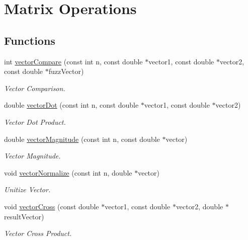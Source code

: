\hypertarget{group__a}{
\section{Matrix Operations}
\label{group__a}
}
\subsection*{Functions}
\begin{CompactItemize}
\item 
int \hyperlink{group__a_gfc9e8bb8b888bf8f1577f0f04ec74f09}{vectorCompare} (const int n, const double $\ast$vector1, const double $\ast$vector2, const double $\ast$fuzzVector)
\begin{CompactList}\small\item\em Vector Comparison. \item\end{CompactList}\item 
double \hyperlink{group__a_gc985f610b5e647c96a03cf89098aa271}{vectorDot} (const int n, const double $\ast$vector1, const double $\ast$vector2)
\begin{CompactList}\small\item\em Vector Dot Product. \item\end{CompactList}\item 
double \hyperlink{group__a_gdf52065f80318dcc65c395566784fbc5}{vectorMagnitude} (const int n, const double $\ast$vector)
\begin{CompactList}\small\item\em Vector Magnitude. \item\end{CompactList}\item 
void \hyperlink{group__a_g0b322588b02d41e5bc4f37b292d15e16}{vectorNormalize} (const int n, double $\ast$vector)
\begin{CompactList}\small\item\em Unitize Vector. \item\end{CompactList}\item 
void \hyperlink{group__a_g1ac846f1472a6bbb80a7b10e44c9c8e7}{vectorCross} (const double $\ast$vector1, const double $\ast$vector2, double $\ast$resultVector)
\begin{CompactList}\small\item\em Vector Cross Product. \item\end{CompactList}\item 

\end{CompactItemize}
